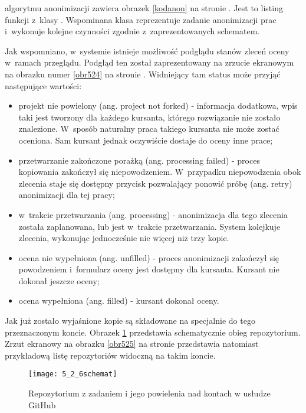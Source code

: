 \medskip
{} algorytmu anonimizacji zawiera obrazek \ref{kodanon} na stronie \pageref{kodanon}. Jest to listing funkcji  z~klasy . Wspominana klasa reprezentuje zadanie anonimizacji prac i~wykonuje kolejne czynności zgodnie z~zaprezentowanych schematem.

\medskip
Jak wspomniano, w~systemie istnieje możliwość podglądu stanów zleceń oceny w~ramach przeglądu. Podgląd ten został zaprezentowany na zrzucie ekranowym na obrazku numer \ref{obr524} na stronie \pageref{obr524}. Widniejący tam status może przyjąć następujące wartości:

\begin{itemize}
    \item projekt nie powielony (ang. project not forked) - informacja dodatkowa, wpis taki jest tworzony dla każdego kursanta, którego rozwiązanie nie zostało znalezione. W~sposób naturalny praca takiego kursanta nie może zostać oceniona. Sam kursant jednak oczywiście dostaje do oceny inne prace;
    \item przetwarzanie zakończone porażką (ang. processing failed) - proces kopiowania zakończył się niepowodzeniem. W~przypadku niepowodzenia obok zlecenia staje się dostępny przycisk pozwalający ponowić próbę (ang. retry) anonimizacji dla tej pracy;
    \item w~trakcie przetwarzania (ang. processing) - anonimizacja dla tego zlecenia została zaplanowana, lub jest w~trakcie przetwarzania. System kolejkuje zlecenia, wykonując jednocześnie nie więcej niż trzy kopie.
    \item ocena nie wypełniona (ang. unfilled) - proces anonimizacji zakończył się powodzeniem i~formularz oceny jest dostępny dla kursanta. Kursant nie dokonał jeszcze oceny;
    \item ocena wypełniona (ang. filled) - kursant dokonał oceny.
\end{itemize}

\medskip
Jak już zostało wyjaśnione kopie są składowane na specjalnie do tego przeznaczonym koncie. Obrazek \ref{526schemat} przedstawia schematycznie obieg repozytorium. Zrzut ekranowy na obrazku \ref{obr525} na stronie \pageref{obr525} przedstawia natomiast przykładową listę repozytoriów widoczną na takim koncie.

\begin{figure}[!h]
    \texttt{[image: 5\_2\_6schemat]}
    \caption{Repozytorium z zadaniem i jego powielenia nad kontach w usłudze GitHub}
    \label{526schemat}
\end{figure}


